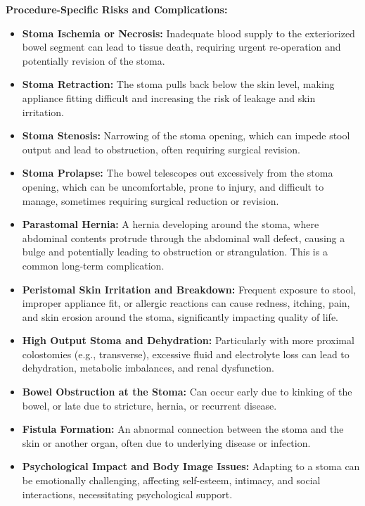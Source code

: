 \textbf{Procedure-Specific Risks and Complications:}
\begin{itemize}
  \item \textbf{Stoma Ischemia or Necrosis:} Inadequate blood supply to the exteriorized bowel segment can lead to tissue death, requiring urgent re-operation and potentially revision of the stoma.
  
  \item \textbf{Stoma Retraction:} The stoma pulls back below the skin level, making appliance fitting difficult and increasing the risk of leakage and skin irritation.
  
  \item \textbf{Stoma Stenosis:} Narrowing of the stoma opening, which can impede stool output and lead to obstruction, often requiring surgical revision.
  
  \item \textbf{Stoma Prolapse:} The bowel telescopes out excessively from the stoma opening, which can be uncomfortable, prone to injury, and difficult to manage, sometimes requiring surgical reduction or revision.
  
  \item \textbf{Parastomal Hernia:} A hernia developing around the stoma, where abdominal contents protrude through the abdominal wall defect, causing a bulge and potentially leading to obstruction or strangulation. This is a common long-term complication.
  
  \item \textbf{Peristomal Skin Irritation and Breakdown:} Frequent exposure to stool, improper appliance fit, or allergic reactions can cause redness, itching, pain, and skin erosion around the stoma, significantly impacting quality of life.
  
  \item \textbf{High Output Stoma and Dehydration:} Particularly with more proximal colostomies (e.g., transverse), excessive fluid and electrolyte loss can lead to dehydration, metabolic imbalances, and renal dysfunction.
  
  \item \textbf{Bowel Obstruction at the Stoma:} Can occur early due to kinking of the bowel, or late due to stricture, hernia, or recurrent disease.
  
  \item \textbf{Fistula Formation:} An abnormal connection between the stoma and the skin or another organ, often due to underlying disease or infection.
  
  \item \textbf{Psychological Impact and Body Image Issues:} Adapting to a stoma can be emotionally challenging, affecting self-esteem, intimacy, and social interactions, necessitating psychological support.
\end{itemize}

